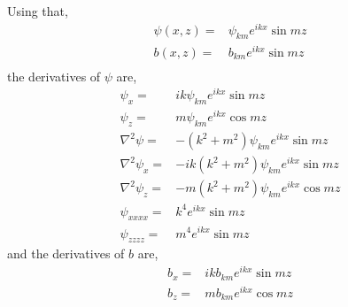 \documentclass[11pt]{article}
\begin{document}
Using that,
\begin{align}
\psi(x,z) =& \psi_{km} e^{ikx} \sin mz \\
b(x,z) =& b_{km} e^{ikx} \sin mz \\
\end{align}
the derivatives of $\psi$ are,
\begin{align}
\psi_x =& ik\psi_{km} e^{ikx} \sin mz \\
\psi_z =& m \psi_{km} e^{ikx} \cos mz \\
\nabla^2 \psi =& -(k^2 + m^2) \psi_{km} e^{ikx} \sin mz \\
\nabla^2 \psi_x =& -i k (k^2 + m^2) \psi_{km} e^{ikx} \sin mz \\
\nabla^2 \psi_z =& -m (k^2 + m^2) \psi_{km} e^{ikx} \cos mz  \\
\psi_{xxxx} = & k^4 e^{ikx} \sin mz \\
\psi_{zzzz} = & m^4 e^{ikx} \sin mz
\end{align}
and the derivatives of $b$ are,
\begin{align}
b_x =& ik b_{km} e^{ikx} \sin mz \\
b_z =& m b_{km} e^{ikx} \cos mz
\end{align}
\end{document}
